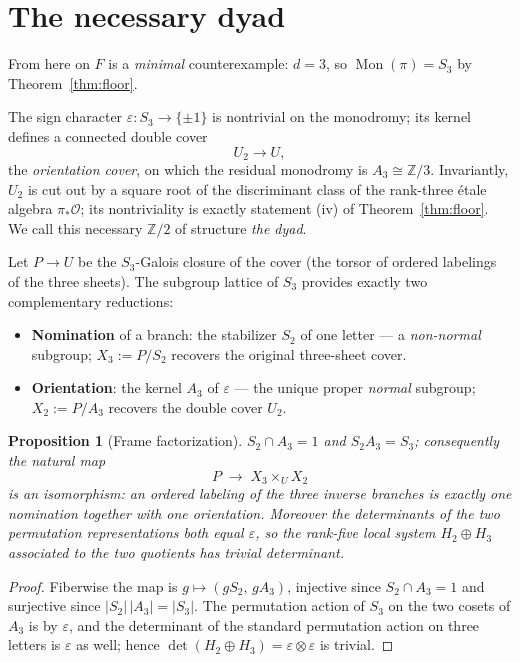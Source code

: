 \documentclass[11pt,reqno]{amsart}
\numberwithin{equation}{section}
\newtheorem{proposition}[theorem]{Proposition}
\theoremstyle{remark}
\newcommand{\Z}{\mathbb Z}
\newcommand{\eps}{\varepsilon}
\DeclareMathOperator{\Mon}{Mon}
\begin{document}
\section{The necessary dyad}\label{sec:dyad}

From here on $F$ is a \emph{minimal} counterexample: $d=3$, so
$\Mon(\pi)=S_3$ by Theorem~\ref{thm:floor}.

The sign character $\eps\colon S_3\to\{\pm1\}$ is nontrivial on the
monodromy; its kernel defines a connected double cover
\[
U_2\longrightarrow U,
\]
the \emph{orientation cover}, on which the residual monodromy is
$A_3\cong\Z/3$. Invariantly, $U_2$ is cut out by a square root of the
discriminant class of the rank-three \'etale algebra $\pi_*\mathcal O$;
its nontriviality is exactly statement (iv) of Theorem~\ref{thm:floor}. We
call this necessary $\Z/2$ of structure \emph{the dyad}.

Let $P\to U$ be the $S_3$-Galois closure of the cover (the torsor of
ordered labelings of the three sheets). The subgroup lattice of $S_3$
provides exactly two complementary reductions:
\begin{itemize}
\item \textbf{Nomination} of a branch: the stabilizer $S_2$ of one letter
--- a \emph{non-normal} subgroup; $X_3:=P/S_2$ recovers the original
three-sheet cover.
\item \textbf{Orientation}: the kernel $A_3$ of $\eps$ --- the unique
proper \emph{normal} subgroup; $X_2:=P/A_3$ recovers the double cover
$U_2$.
\end{itemize}

\begin{proposition}[Frame factorization]\label{prop:frame}
$S_2\cap A_3=1$ and $S_2A_3=S_3$; consequently the natural map
\[
P\;\longrightarrow\;X_3\times_U X_2
\]
is an isomorphism: an ordered labeling of the three inverse branches is
exactly one nomination together with one orientation. Moreover the
determinants of the two permutation representations both equal $\eps$, so
the rank-five local system $H_2\oplus H_3$ associated to the two quotients
has trivial determinant.
\end{proposition}

\begin{proof}
Fiberwise the map is $g\mapsto(gS_2,\,gA_3)$, injective since
$S_2\cap A_3=1$ and surjective since $|S_2|\,|A_3|=|S_3|$. The permutation
action of $S_3$ on the two cosets of $A_3$ is by $\eps$, and the
determinant of the standard permutation action on three letters is $\eps$
as well; hence $\det(H_2\oplus H_3)=\eps\otimes\eps$ is trivial.
\end{proof}
\end{document}
